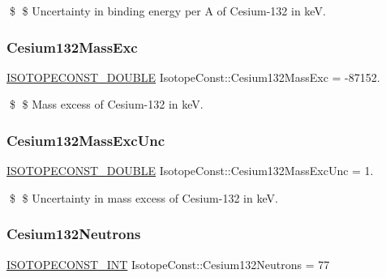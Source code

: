 \$ \$ Uncertainty in binding energy per A of Cesium-\/132 in keV. \mbox{\label{group___isotope_const-_cesium-_cs132_ga5d27d5ccb4bcd402373c0735a06ea04e}} 
\subsubsection{\texorpdfstring{Cesium132\+Mass\+Exc}{Cesium132MassExc}}
{\footnotesize\ttfamily \mbox{\hyperlink{group___isotope_const-_macros_ga8f45a7272ce02c0b4c65c44636ed719a}{I\+S\+O\+T\+O\+P\+E\+C\+O\+N\+S\+T\+\_\+\+D\+O\+U\+B\+LE}} Isotope\+Const\+::\+Cesium132\+Mass\+Exc = -\/87152.}

\$ \$ Mass excess of Cesium-\/132 in keV. \mbox{\label{group___isotope_const-_cesium-_cs132_ga516d4a40267734a4a466c6c6f3a99b3b}} 
\subsubsection{\texorpdfstring{Cesium132\+Mass\+Exc\+Unc}{Cesium132MassExcUnc}}
{\footnotesize\ttfamily \mbox{\hyperlink{group___isotope_const-_macros_ga8f45a7272ce02c0b4c65c44636ed719a}{I\+S\+O\+T\+O\+P\+E\+C\+O\+N\+S\+T\+\_\+\+D\+O\+U\+B\+LE}} Isotope\+Const\+::\+Cesium132\+Mass\+Exc\+Unc = 1.}

\$ \$ Uncertainty in mass excess of Cesium-\/132 in keV. \mbox{\label{group___isotope_const-_cesium-_cs132_ga2f324596971845acc6eb5ed66293a732}} 
\subsubsection{\texorpdfstring{Cesium132\+Neutrons}{Cesium132Neutrons}}
{\footnotesize\ttfamily \mbox{\hyperlink{group___isotope_const-_macros_ga5f18360b3e99483a35c32d789e62621c}{I\+S\+O\+T\+O\+P\+E\+C\+O\+N\+S\+T\+\_\+\+I\+NT}} Isotope\+Const\+::\+Cesium132\+Neutrons = 77}


